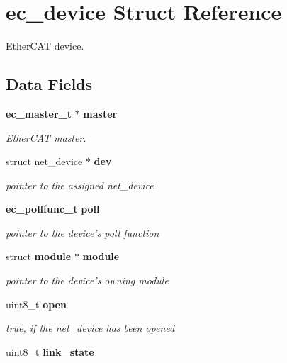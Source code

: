 \section{ec\-\_\-device \-Struct \-Reference}
\label{structec__device}


\-Ether\-C\-A\-T device.  


\subsection*{\-Data \-Fields}
\begin{DoxyCompactItemize}
\item 
{\bf ec\-\_\-master\-\_\-t} $\ast$ {\bf master}\label{structec__device_a3678edcc317d6324936b02c4509de443}

\begin{DoxyCompactList}\small\item\em \-Ether\-C\-A\-T master. \end{DoxyCompactList}\item 
struct net\-\_\-device $\ast$ {\bf dev}\label{structec__device_a9503692598d3950969ca8b4daf5fd5ac}

\begin{DoxyCompactList}\small\item\em pointer to the assigned net\-\_\-device \end{DoxyCompactList}\item 
{\bf ec\-\_\-pollfunc\-\_\-t} {\bf poll}\label{structec__device_aa51d769eb590a04e98f8544ea758322f}

\begin{DoxyCompactList}\small\item\em pointer to the device's poll function \end{DoxyCompactList}\item 
struct {\bf module} $\ast$ {\bf module}\label{structec__device_a79af9075672aa2abf993a703b4d964ed}

\begin{DoxyCompactList}\small\item\em pointer to the device's owning module \end{DoxyCompactList}\item 
uint8\-\_\-t {\bf open}\label{structec__device_a0a3f5a12926e0d4ef17409d05b36d18a}

\begin{DoxyCompactList}\small\item\em true, if the net\-\_\-device has been opened \end{DoxyCompactList}\item 
uint8\-\_\-t {\bf link\-\_\-state}\label{structec__device_ab58236227ed28e568e0de571499d5e68}


\end{DoxyCompactItemize}

